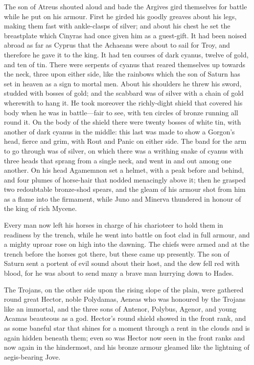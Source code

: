 The son of Atreus shouted aloud and bade the Argives gird themselves for
battle while he put on his armour. First he girded his goodly greaves
about his legs, making them fast with ankle-clasps of silver; and about
his chest he set the breastplate which Cinyras had once given him as a
guest-gift. It had been noised abroad as far as Cyprus that the Achaeans
were about to sail for Troy, and therefore he gave it to the king. It had
ten courses of dark cyanus, twelve of gold, and ten of tin. There were
serpents of cyanus that reared themselves up towards the neck, three upon
either side, like the rainbows which the son of Saturn has set in heaven
as a sign to mortal men. About his shoulders he threw his sword, studded
with bosses of gold; and the scabbard was of silver with a chain of gold
wherewith to hang it. He took moreover the richly-dight shield that
covered his body when he was in battle—fair to see, with ten circles
of bronze running all round it. On the body of the shield there were
twenty bosses of white tin, with another of dark cyanus in the middle:
this last was made to show a Gorgon’s head, fierce and grim, with Rout and
Panic on either side. The band for the arm to go through was of silver, on
which there was a writhing snake of cyanus with three heads that sprang
from a single neck, and went in and out among one another. On his head
Agamemnon set a helmet, with a peak before and behind, and four plumes of
horse-hair that nodded menacingly above it; then he grasped two
redoubtable bronze-shod spears, and the gleam of his armour shot from him
as a flame into the firmament, while Juno and Minerva thundered in honour
of the king of rich Mycene.

Every man now left his horses in charge of his charioteer to hold them in
readiness by the trench, while he went into battle on foot clad in full
armour, and a mighty uproar rose on high into the dawning. The chiefs were
armed and at the trench before the horses got there, but these came up
presently. The son of Saturn sent a portent of evil sound about their
host, and the dew fell red with blood, for he was about to send many a
brave man hurrying down to Hades.

The Trojans, on the other side upon the rising slope of the plain, were
gathered round great Hector, noble Polydamas, Aeneas who was honoured by
the Trojans like an immortal, and the three sons of Antenor, Polybus,
Agenor, and young Acamas beauteous as a god. Hector’s round shield showed
in the front rank, and as some baneful star that shines for a moment
through a rent in the clouds and is again hidden beneath them; even so was
Hector now seen in the front ranks and now again in the hindermost, and
his bronze armour gleamed like the lightning of aegis-bearing Jove.

